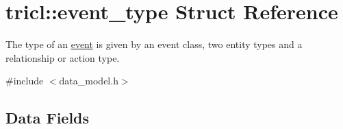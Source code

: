 \hypertarget{structtricl_1_1event__type}{}\section{tricl\+:\+:event\+\_\+type Struct Reference}
\label{structtricl_1_1event__type}


The type of an \hyperlink{structtricl_1_1event}{event} is given by an event class, two entity types and a relationship or action type.  




{\ttfamily \#include $<$data\+\_\+model.\+h$>$}

\subsection*{Data Fields}
